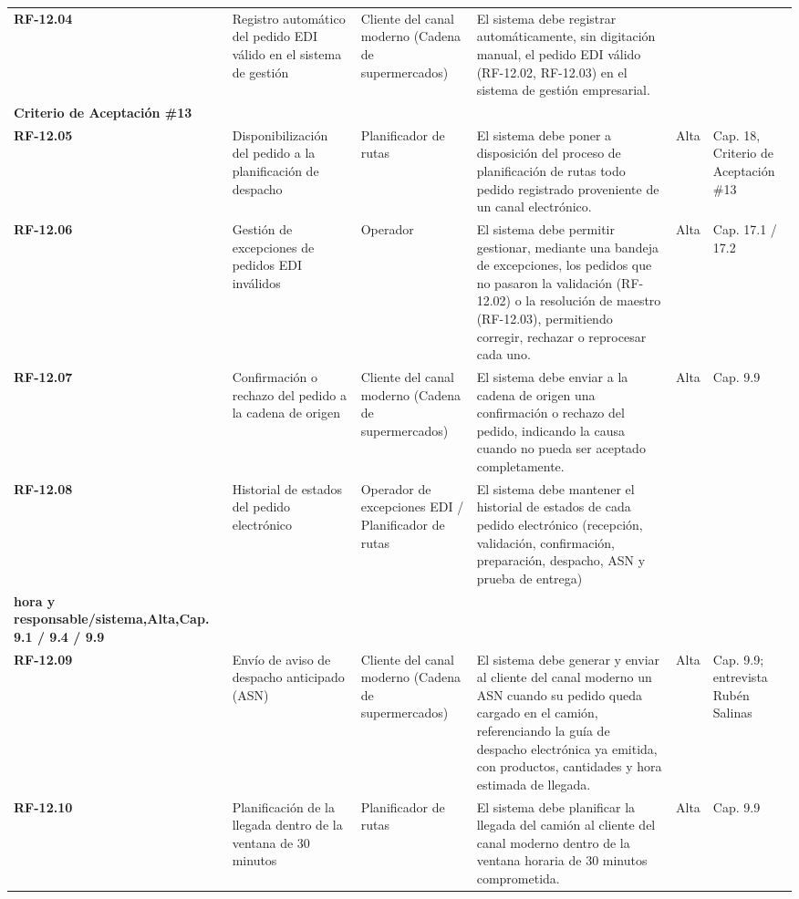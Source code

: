 \begin{longtable}{p{1.7cm} p{2.3cm} p{1.9cm} p{5.0cm} p{1.1cm} p{1.9cm}}
\textbf{RF-12.04} & Registro automático del pedido EDI válido en el sistema de gestión & Cliente del canal moderno (Cadena de supermercados) & El sistema debe registrar automáticamente, sin digitación manual, el pedido EDI válido (RF-12.02, RF-12.03) en el sistema de gestión empresarial. &  &  \\
\textbf{Criterio de Aceptación \#13} &  &  &  &  &  \\
\textbf{RF-12.05} & Disponibilización del pedido a la planificación de despacho & Planificador de rutas & El sistema debe poner a disposición del proceso de planificación de rutas todo pedido registrado proveniente de un canal electrónico. & Alta & Cap. 18, Criterio de Aceptación \#13 \\
\textbf{RF-12.06} & Gestión de excepciones de pedidos EDI inválidos & Operador & El sistema debe permitir gestionar, mediante una bandeja de excepciones, los pedidos que no pasaron la validación (RF-12.02) o la resolución de maestro (RF-12.03), permitiendo corregir, rechazar o reprocesar cada uno. & Alta & Cap. 17.1 / 17.2 \\
\textbf{RF-12.07} & Confirmación o rechazo del pedido a la cadena de origen & Cliente del canal moderno (Cadena de supermercados) & El sistema debe enviar a la cadena de origen una confirmación o rechazo del pedido, indicando la causa cuando no pueda ser aceptado completamente. & Alta & Cap. 9.9 \\
\textbf{RF-12.08} & Historial de estados del pedido electrónico & Operador de excepciones EDI / Planificador de rutas & El sistema debe mantener el historial de estados de cada pedido electrónico (recepción, validación, confirmación, preparación, despacho, ASN y prueba de entrega) &  &  \\
\textbf{hora y responsable/sistema,Alta,Cap. 9.1 / 9.4 / 9.9} &  &  &  &  &  \\
\textbf{RF-12.09} & Envío de aviso de despacho anticipado (ASN) & Cliente del canal moderno (Cadena de supermercados) & El sistema debe generar y enviar al cliente del canal moderno un ASN cuando su pedido queda cargado en el camión, referenciando la guía de despacho electrónica ya emitida, con productos, cantidades y hora estimada de llegada. & Alta & Cap. 9.9; entrevista Rubén Salinas \\
\textbf{RF-12.10} & Planificación de la llegada dentro de la ventana de 30 minutos & Planificador de rutas & El sistema debe planificar la llegada del camión al cliente del canal moderno dentro de la ventana horaria de 30 minutos comprometida. & Alta & Cap. 9.9 \\

\end{longtable}
